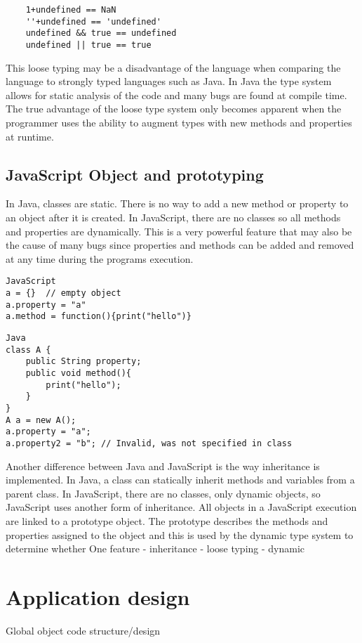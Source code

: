 \documentclass{report}
\begin{document}
	\begin{verbatim}
	1+undefined == NaN
	''+undefined == 'undefined'
	undefined && true == undefined
	undefined || true == true
	\end{verbatim}
This loose typing may be a disadvantage of the language when comparing the language to strongly typed languages such as Java. In Java the type system allows for static analysis of the code and many bugs are found at compile time. The true advantage of the loose type system only becomes apparent when the programmer uses the ability to augment types with new methods and properties at runtime.

	\subsection{JavaScript Object and prototyping}
	In Java, classes are static. There is no way to add a new method or property to an object after it is created. In JavaScript, there are no classes so all methods and properties are dynamically. This is a very powerful feature that may also be the cause of many bugs since properties and methods can be added and removed at any time during the programs execution.
\begin{verbatim}
JavaScript
a = {} 	// empty object
a.property = "a"
a.method = function(){print("hello")}
\end{verbatim}

\begin{verbatim}
Java
class A {
	public String property;
	public void method(){
		print("hello");
	}
}
A a = new A();
a.property = "a";
a.property2 = "b"; // Invalid, was not specified in class
\end{verbatim}

Another difference between Java and JavaScript is the way inheritance is implemented. In Java, a class can statically inherit methods and variables from a parent class. In JavaScript, there are no classes, only dynamic objects, so JavaScript uses another form of inheritance. All objects in a JavaScript execution are linked to a prototype object. The prototype describes the methods and properties assigned to the object and this is used by the dynamic type system to determine whether 
	One feature
	- inheritance
	- loose typing
	- dynamic
\section{Application design}
	Global object
	code structure/design
\end{document}
